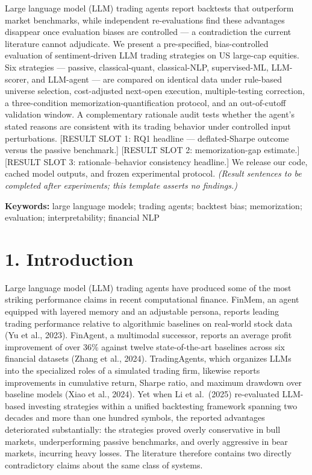 \documentclass[
  12pt,
]{article}
\begin{document}
Large language model (LLM) trading agents report backtests that
outperform market benchmarks, while independent re-evaluations find
these advantages disappear once evaluation biases are controlled --- a
contradiction the current literature cannot adjudicate. We present a
pre-specified, bias-controlled evaluation of sentiment-driven LLM
trading strategies on US large-cap equities. Six strategies --- passive,
classical-quant, classical-NLP, supervised-ML, LLM-scorer, and LLM-agent
--- are compared on identical data under rule-based universe selection,
cost-adjusted next-open execution, multiple-testing correction, a
three-condition memorization-quantification protocol, and an
out-of-cutoff validation window. A complementary rationale audit tests
whether the agent's stated reasons are consistent with its trading
behavior under controlled input perturbations. {[}RESULT SLOT 1: RQ1
headline --- deflated-Sharpe outcome versus the passive benchmark.{]}
{[}RESULT SLOT 2: memorization-gap estimate.{]} {[}RESULT SLOT 3:
rationale--behavior consistency headline.{]} We release our code, cached
model outputs, and frozen experimental protocol. \emph{(Result sentences
to be completed after experiments; this template asserts no findings.)}

\textbf{Keywords:} large language models; trading agents; backtest bias;
memorization; evaluation; interpretability; financial NLP

\hypertarget{introduction}{%
\section{1. Introduction}\label{introduction}}

Large language model (LLM) trading agents have produced some of the most
striking performance claims in recent computational finance. FinMem, an
agent equipped with layered memory and an adjustable persona, reports
leading trading performance relative to algorithmic baselines on
real-world stock data (Yu et al., 2023). FinAgent, a multimodal
successor, reports an average profit improvement of over 36\% against
twelve state-of-the-art baselines across six financial datasets (Zhang
et al., 2024). TradingAgents, which organizes LLMs into the specialized
roles of a simulated trading firm, likewise reports improvements in
cumulative return, Sharpe ratio, and maximum drawdown over baseline
models (Xiao et al., 2024). Yet when Li et al.~(2025) re-evaluated
LLM-based investing strategies within a unified backtesting framework
spanning two decades and more than one hundred symbols, the reported
advantages deteriorated substantially: the strategies proved overly
conservative in bull markets, underperforming passive benchmarks, and
overly aggressive in bear markets, incurring heavy losses. The
literature therefore contains two directly contradictory claims about
the same class of systems.
\end{document}
